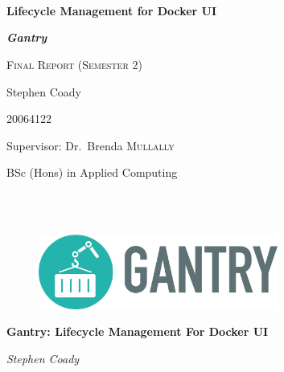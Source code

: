 \begin{titlepage}
	\centering
	\mbox{}\\
	\mbox{}\\
	\mbox{}\\
	{\huge\bfseries Lifecycle Management for Docker UI \par}
	{\Large\bfseries \textit{Gantry}\par}
	\vspace{1cm}
	{\scshape\large Final Report (Semester 2)\par}
	\vspace{3cm}
	{\Large Stephen Coady\par}
	{\Large 20064122\par}
	\vspace{3cm}\par
	\vfill
	{\Large Supervisor: Dr.~Brenda \textsc{Mullally}}
	\vspace{1cm}\par
	{\Large BSc (Hons) in Applied Computing\par}


	\vfill
	
	\clearpage
	\thispagestyle{empty}
	\centering
	\mbox{}\\
	\mbox{}\\
	\begin{figure}[!ht]
	\centering
	\includegraphics*[width=0.7\textwidth]{images/gantry-single-darktext}
	\label{fig:gantry-single-darktext}
	\end{figure}
	
	{\huge\bfseries Gantry: Lifecycle Management For Docker UI \par}
	\vspace{1cm}
	{\Large \textit{Stephen Coady}\par}
	\vspace{3cm}\par
	\vfill
	\vspace{1cm}\par


	\vfill
\end{titlepage}
